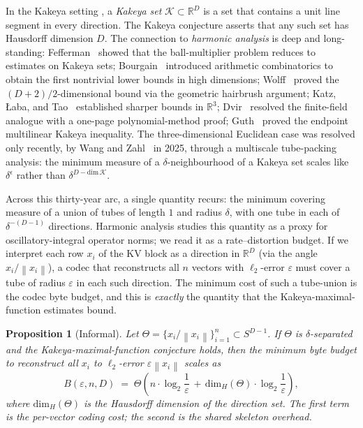 \documentclass[11pt,a4paper]{article}
\theoremstyle{definition}
\theoremstyle{plain}
\newtheorem{proposition}[theorem]{Proposition}
\newcommand{\R}{\mathbb{R}}
\newcommand{\norm}[1]{\left\lVert#1\right\rVert}
\begin{document}
In the Kakeya setting \cite{kakeya-problem}, a \emph{Kakeya set} $\mathcal{K} \subset \R^D$ is a set that contains a unit line segment in every direction. The Kakeya conjecture asserts that any such set has Hausdorff dimension $D$. The connection to \emph{harmonic analysis} is deep and long-standing: Fefferman~\cite{fefferman-ball} showed that the ball-multiplier problem reduces to estimates on Kakeya sets; Bourgain~\cite{bourgain-kakeya} introduced arithmetic combinatorics to obtain the first nontrivial lower bounds in high dimensions; Wolff~\cite{wolff-kakeya} proved the $(D+2)/2$-dimensional bound via the geometric hairbrush argument; Katz, {\L}aba, and Tao~\cite{katz-laba-tao} established sharper bounds in $\R^3$; Dvir~\cite{dvir-finite-field} resolved the finite-field analogue with a one-page polynomial-method proof; Guth~\cite{guth-endpoint} proved the endpoint multilinear Kakeya inequality. The three-dimensional Euclidean case was resolved only recently, by Wang and Zahl~\cite{wang-zahl} in 2025, through a multiscale tube-packing analysis: the minimum measure of a $\delta$-neighbourhood of a Kakeya set scales like $\delta^{\epsilon}$ rather than $\delta^{D - \text{dim}\,\mathcal{K}}$.

Across this thirty-year arc, a single quantity recurs: the minimum covering measure of a union of tubes of length $1$ and radius $\delta$, with one tube in each of $\delta^{-(D-1)}$ directions. Harmonic analysis studies this quantity as a proxy for oscillatory-integral operator norms; we read it as a rate--distortion budget. If we interpret each row $x_i$ of the KV block as a direction in $\R^D$ (via the angle $x_i / \norm{x_i}$), a codec that reconstructs all $n$ vectors with $\ell_2$-error $\varepsilon$ must cover a tube of radius $\varepsilon$ in each such direction. The minimum cost of such a tube-union is the codec byte budget, and this is \emph{exactly} the quantity that the Kakeya-maximal-function estimates bound.

\begin{proposition}[Informal]
\label{prop:kakeya-rd}
Let $\Theta = \{x_i / \norm{x_i}\}_{i=1}^n \subset S^{D-1}$. If $\Theta$ is $\delta$-separated and the Kakeya-maximal-function conjecture holds, then the minimum byte budget to reconstruct all $x_i$ to $\ell_2$-error $\varepsilon\norm{x_i}$ scales as
\begin{equation}
B(\varepsilon, n, D) \;=\; \Theta\!\left(n \cdot \log_2\!\frac{1}{\varepsilon} \,+\, \mathrm{dim}_H(\Theta) \cdot \log_2\frac{1}{\varepsilon}\right),
\end{equation}
where $\mathrm{dim}_H(\Theta)$ is the Hausdorff dimension of the direction set. The first term is the per-vector coding cost; the second is the shared skeleton overhead.
\end{proposition}
\end{document}
